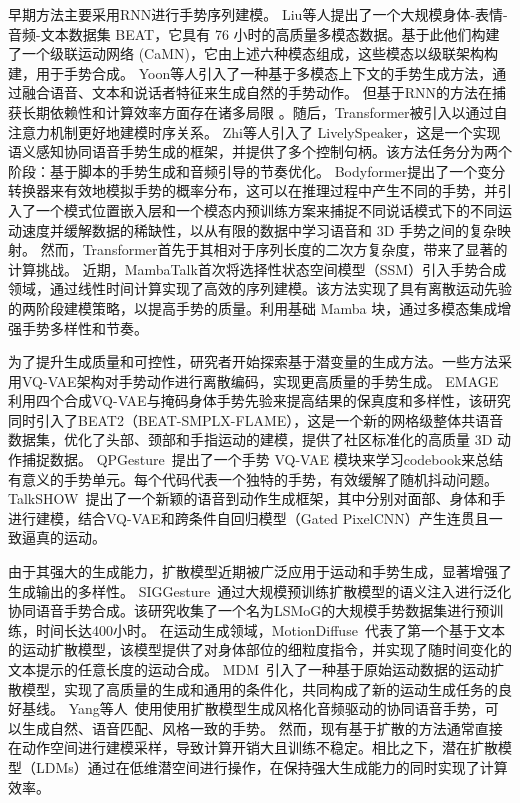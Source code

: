 早期方法主要采用RNN\cite{liu2022beat,yoon2020speech}进行手势序列建模。
Liu等人\cite{liu2022beat}提出了一个大规模身体-表情-音频-文本数据集 BEAT，它具有 76 小时的高质量多模态数据。基于此他们构建了一个级联运动网络 (CaMN)，它由上述六种模态组成，这些模态以级联架构构建，用于手势合成。
Yoon等人\cite{yoon2020speech}引入了一种基于多模态上下文的手势生成方法，通过融合语音、文本和说话者特征来生成自然的手势动作。
但基于RNN的方法在捕获长期依赖性和计算效率方面存在诸多局限
。随后，Transformer\cite{zhi2023livelyspeaker, pang2023bodyformer}被引入以通过自注意力机制更好地建模时序关系。
Zhi等人\cite{zhi2023livelyspeaker}引入了 LivelySpeaker，这是一个实现语义感知协同语音手势生成的框架，并提供了多个控制句柄。该方法任务分为两个阶段：基于脚本的手势生成和音频引导的节奏优化。
Bodyformer\cite{pang2023bodyformer}提出了一个变分转换器来有效地模拟手势的概率分布，这可以在推理过程中产生不同的手势，并引入了一个模式位置嵌入层和一个模态内预训练方案来捕捉不同说话模式下的不同运动速度并缓解数据的稀缺性，以从有限的数据中学习语音和 3D 手势之间的复杂映射。
然而，Transformer首先于其相对于序列长度的二次方复杂度，带来了显著的计算挑战。
近期，MambaTalk\cite{xu2025mambatalk}首次将选择性状态空间模型（SSM）引入手势合成领域，通过线性时间计算实现了高效的序列建模。该方法实现了具有离散运动先验的两阶段建模策略，以提高手势的质量。利用基础 Mamba 块，通过多模态集成增强手势多样性和节奏。

为了提升生成质量和可控性，研究者开始探索基于潜变量的生成方法。一些方法采用VQ-VAE架构对手势动作进行离散编码，实现更高质量的手势生成。
EMAGE~\cite{liu2024emage} 利用四个合成VQ-VAE与掩码身体手势先验来提高结果的保真度和多样性，该研究同时引入了BEAT2（BEAT-SMPLX-FLAME），这是一个新的网格级整体共语音数据集，优化了头部、颈部和手指运动的建模，提供了社区标准化的高质量 3D 动作捕捉数据。
QPGesture~\cite{yang2023qpgesture}提出了一个手势 VQ-VAE 模块来学习codebook来总结有意义的手势单元。每个代码代表一个独特的手势，有效缓解了随机抖动问题。
TalkSHOW~\cite{yi2023generating}提出了一个新颖的语音到动作生成框架，其中分别对面部、身体和手进行建模，结合VQ-VAE和跨条件自回归模型（Gated PixelCNN）产生连贯且一致逼真的运动。

由于其强大的生成能力，扩散模型\cite{cheng2024siggesture,alexanderson2023listen,tevet2022mdm,yang2023diffusestylegesture}近期被广泛应用于运动和手势生成，显著增强了生成输出的多样性。
SIGGesture~\cite{cheng2024siggesture}通过大规模预训练扩散模型的语义注入进行泛化协同语音手势合成。该研究收集了一个名为LSMoG的大规模手势数据集进行预训练，时间长达400小时。
在运动生成领域，MotionDiffuse~\cite{zhang2024motiondiffuse}代表了第一个基于文本的运动扩散模型，该模型提供了对身体部位的细粒度指令，并实现了随时间变化的文本提示的任意长度的运动合成。
MDM~\cite{tevet2022mdm}引入了一种基于原始运动数据的运动扩散模型，实现了高质量的生成和通用的条件化，共同构成了新的运动生成任务的良好基线。
Yang等人~\cite{yang2023diffusestylegesture}使用使用扩散模型生成风格化音频驱动的协同语音手势，可以生成自然、语音匹配、风格一致的手势。
然而，现有基于扩散的方法通常直接在动作空间进行建模采样，导致计算开销大且训练不稳定。相比之下，潜在扩散模型（LDMs）\cite{rombach2022high}通过在低维潜空间进行操作，在保持强大生成能力的同时实现了计算效率。

